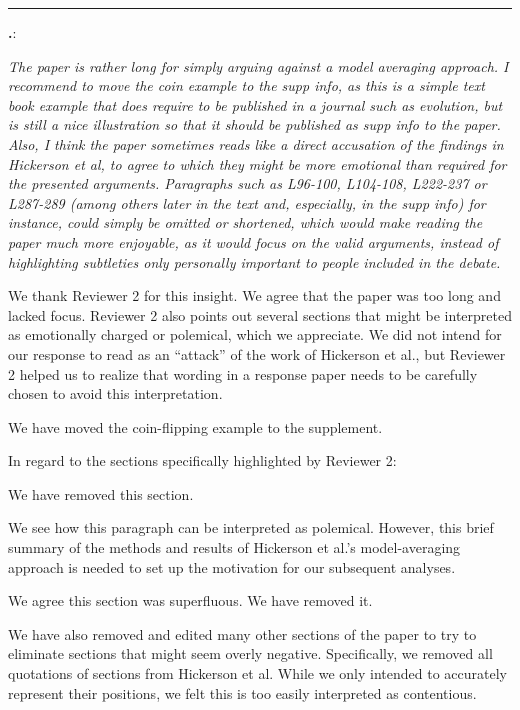 \documentclass[12pt]{article}
\newcounter{commentCounter}
\newcommand{\revcomment}[1]{{\addtocounter{commentCounter}{1}}
    \medskip \hrule \noindent
\textbf{\arabic{section}.\arabic{commentCounter}}: {\sl #1}\par\xspace}
\newcommand{\response}[1]{{\addtolength{\leftskip}{0.25in} #1\par}\xspace}
\begin{document}
\revcomment{
    The paper is rather long for simply arguing against a model averaging
    approach. I recommend to move the coin example to the supp info, as this is
    a simple text book example that does require to be published in a journal
    such as evolution, but is still a nice illustration so that it should be
    published as supp info to the paper. Also, I think the paper sometimes
    reads like a direct accusation of the findings in Hickerson et al, to agree
    to which they might be more emotional than required for the presented
    arguments. Paragraphs such as L96-100, L104-108, L222-237 or L287-289
    (among others later in the text and, especially, in the supp info) for
    instance, could simply be omitted or shortened, which would make reading
    the paper much more enjoyable, as it would focus on the valid arguments,
    instead of highlighting subtleties only personally important to people
    included in the debate.
    
}
\response{
    We thank Reviewer 2 for this insight. We agree that the paper was too long
    and lacked focus. Reviewer 2 also points out several sections that might be
    interpreted as emotionally charged or polemical, which we appreciate. We
    did not intend for our response to read as an ``attack'' of the work of
    Hickerson et al., but Reviewer 2 helped us to realize that wording in a
    response paper needs to be carefully chosen to avoid this interpretation.

    We have moved the coin-flipping example to the supplement.

    In regard to the sections specifically highlighted by Reviewer 2:
    \begin{description}[align=left,labelindent=0.5in,leftmargin=0.75in]
        \item[L96-100 and L104-108]
            We have removed this section.
        \item[L222-237]
            We see how this paragraph can be interpreted as polemical. However,
            this brief summary of the methods and results of Hickerson et al.'s
            model-averaging approach is needed to set up the motivation for our
            subsequent analyses.
        \item[L287-289]
            We agree this section was superfluous. We have removed it.
    \end{description}
    
    We have also removed and edited many other sections of the paper to try to
    eliminate sections that might seem overly negative. Specifically, we
    removed all quotations of sections from Hickerson et al. While we only
    intended to accurately represent their positions, we felt this is too
    easily interpreted as contentious.
}
\end{document}
